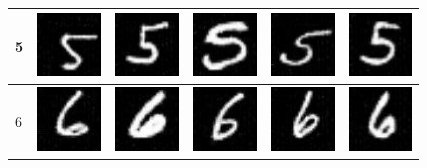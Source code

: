 \begin{table}[H]
\begin{tabular}{|llllll|}
5 & \includegraphics[width=1.69cm, height=1.69cm]{Files/MNIST/0-5.png}  &\includegraphics[width=1.69cm, height=1.69cm]{Files/MNIST/1-7.png}   & \includegraphics[width=1.69cm, height=1.69cm]{Files/MNIST/3-1.png}  & \includegraphics[width=1.69cm, height=1.69cm]{Files/MNIST/5-5.png}  & \includegraphics[width=1.69cm, height=1.69cm]{Files/MNIST/6-7.png} \\ \hline

6 & \includegraphics[width=1.69cm, height=1.69cm]{Files/MNIST/0-6.png}  &\includegraphics[width=1.69cm, height=1.69cm]{Files/MNIST/2-0.png}   & \includegraphics[width=1.69cm, height=1.69cm]{Files/MNIST/3-2.png}  & \includegraphics[width=1.69cm, height=1.69cm]{Files/MNIST/5-6.png}  & \includegraphics[width=1.69cm, height=1.69cm]{Files/MNIST/7-0.png} \\ \hline


\end{tabular}
\end{table}
